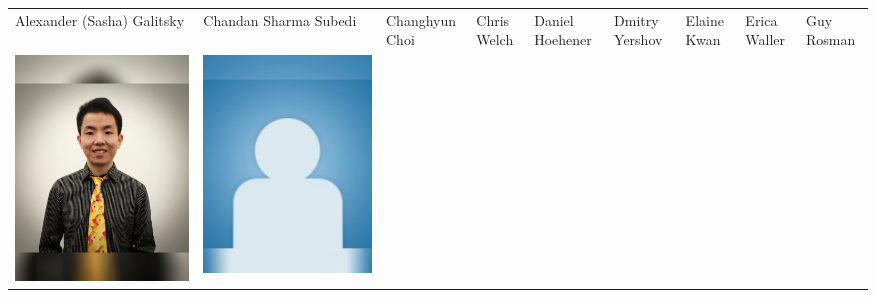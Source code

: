 \documentclass[landscape,a0paper,fontscale=0.292]{baposter}
\begin{document}
\begin{poster}
{\begin{center}
\begin{tabularx}{\linewidth}{X X X X X X X X X}
{\tiny \centering Alexander (Sasha) Galitsky }& {\tiny \centering Chandan Sharma Subedi }& {\tiny \centering Changhyun Choi }& {\tiny \centering Chris Welch }& {\tiny \centering Daniel Hoehener }& {\tiny \centering Dmitry Yershov }& {\tiny \centering Elaine Kwan }& {\tiny \centering Erica Waller }& {\tiny \centering Guy Rosman }\\ 
 {\centering \includegraphics[width=0.65\linewidth]{zhao.jpg}}&
{\centering \includegraphics[width=0.65\linewidth]{MISSING.jpg}}&

\end{tabularx}
\end{center}}
\end{poster}
\end{document}
